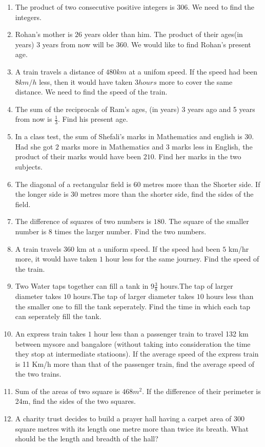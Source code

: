 \begin{enumerate}[label=\thesubsection.\arabic*,ref=\thesubsection.\theenumi,resume*]
\item The product of two consecutive positive integers is $306$. We need to find the integers.
\item Rohan's mother is $26$ years older than him. The product of their ages(in years) $3$ years from now will be $360$. We would like to find Rohan's present age.
\item A train travels a distance of $480km$ at a unifom speed. If the speed had been $8km/h$ less, then it would have taken $3 hours$ more to cover the same distance. We need to find the speed of the train.
\item The sum of the reciprocals of Ram's ages, (in years) 3 years ago and 5 years from now is $\frac{1}{3}$. Find his present age.
\item In a class test, the sum of Shefali's  marks in Mathematics and english is $30$. Had she got $2$ marks more in Mathematics and $3$ marks less in English, the product of their marks would have been $210$. Find her marks in the two subjects. 
\item The diagonal of a rectangular field is $60$ metres more than the Shorter side. If the longer side is $30$ metres more than the shorter side, find the sides of the field.
\item The difference of squares of two numbers is $180$. The square of the smaller number is $8$ times the larger number. Find the two numbers.
\item A train travels $360$ km at a uniform speed. If the speed had been $5$ km/hr more, it would have taken $1$ hour less for the same journey. Find the speed of the train.
\item Two Water taps together can fill a tank in $9\frac{3}{8}$ hours.The tap of larger diameter takes $10$ hours.The tap of larger diameter takes $10$ hours less than the smaller one to fill the tank seperately. Find the time in which each tap can seperately fill the  tank.
\item An express train takes $1$ hour less than a passenger train to travel 132 km between mysore and bangalore (without taking into consideration the time they stop at intermediate statioons). If the average speed of the express train is 11 Km/h more than that of the passenger train, find the average speed of the two trains.
\item Sum of the areas of two square is $468m^2$. If the difference of their perimeter is 24m, find the sides of the two squares.  
\item  A charity trust decides to build a prayer hall having a carpet area of 300 square metres with its length one metre more than twice its breath. What should be the length and breadth of the hall?

\end{enumerate}
